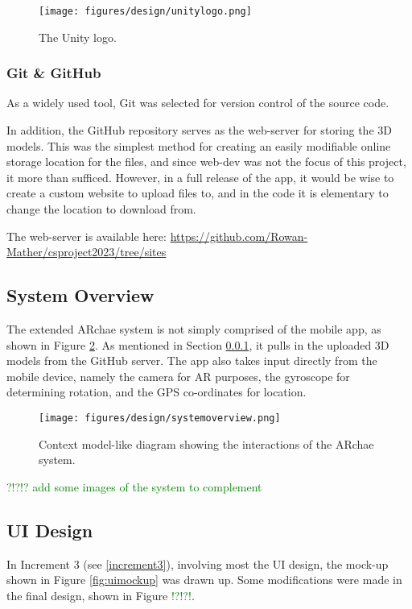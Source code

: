 \documentclass{article}
\newcommand{\could}[1]{\textcolor{green}{#1}}
\begin{document}
\begin{figure}[h]
    \centering
    \texttt{[image: figures/design/unitylogo.png]}
        \caption{The Unity logo.}
        \label{fig:unitylogo}
\end{figure}

\subsubsection{Git \& GitHub}
\label{gitandgithub}
As a widely used tool, Git was selected for version control of the source code. 

In addition, the GitHub repository serves as the web-server for storing the 3D models. This was the simplest method for creating an easily modifiable online storage location for the files, and since web-dev was not the focus of this project, it more than sufficed. However, in a full release of the app, it would be wise to create a custom website to upload files to, and in the code it is elementary to change the location to download from.

The web-server is available here: \url{https://github.com/Rowan-Mather/csproject2023/tree/sites} \cite{tools:repo}

\subsection{System Overview}
The extended ARchae system is not simply comprised of the mobile app, as shown in Figure \ref{fig:systemoverview}. As mentioned in Section \ref{gitandgithub}, it pulls in the uploaded 3D models from the GitHub server. The app also takes input directly from the mobile device, namely the camera for AR purposes, the gyroscope for determining rotation, and the GPS co-ordinates for location.

\begin{figure}[h]
    \centering
    \texttt{[image: figures/design/systemoverview.png]}
        \caption{Context model-like diagram showing the interactions of the ARchae system.}
        \label{fig:systemoverview}
\end{figure}

\could{?!?!? add some images of the system to complement}

\subsection{UI Design}
\label{uidesign}
In Increment 3 (see \ref{increment3}), involving most the UI design, the mock-up shown in Figure \ref{fig:uimockup} was drawn up. Some modifications were made in the final design, shown in Figure \could{!?!?!}.
\end{document}
